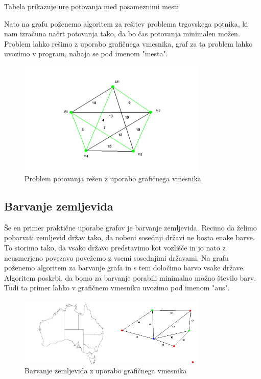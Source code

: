 \documentclass[11pt]{article}
\begin{document}
\begin{center}
\null
\thinspace
Tabela prikazuje ure potovanja med posameznimi mesti
\end{center}

\noindent Nato na grafu poženemo algoritem za rešitev problema trgovskega potnika, ki nam izračuna načrt potovanja tako, da bo čas potovanja minimalen možen. Problem lahko rešimo z uporabo grafičnega vmesnika, graf za ta problem lahko uvozimo v program, nahaja se pod imenom "mesta".

\begin{figure}[H]
    \centering
    \includegraphics[width=0.8\textwidth]{TSP.png}
    \caption{Problem potovanja rešen z uporabo grafičnega vmesnika}
    \label{fig:mesh1}
\end{figure}


\subsection{Barvanje zemljevida}

Še en primer praktične uporabe grafov je barvanje zemljevida. Recimo da želimo pobarvati zemljevid držav tako, da nobeni sosednji državi ne bosta enake barve. To storimo tako, da vsako državo predstavimo kot vozlišče in jo nato z neusmerjeno povezavo povežemo z vsemi sosednjimi državami. Na grafu poženemo algoritem za barvanje grafa in s tem določimo barvo vsake države. Algoritem poskrbi, da bomo za barvanje porabili minimalno možno število barv. Tudi ta primer lahko v grafičnem vmesniku uvozimo pod imenom "aus".

\begin{figure}[H]
    \centering
    \includegraphics[width=0.8\textwidth]{australia.png}
    \caption{Barvanje zemljevida z uporabo grafičnega vmesnika \cite{ausIMG}}
    \label{fig:mesh1}
\end{figure}
\end{document}
